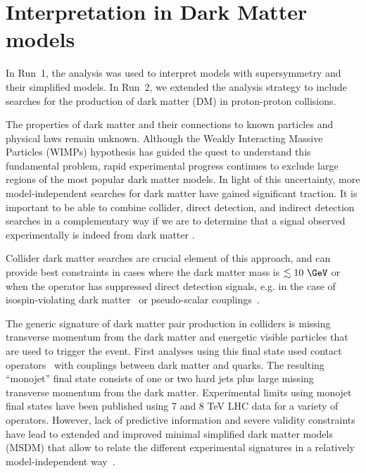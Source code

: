 \section{Interpretation in Dark Matter models}
\label{sec:darkmatter}

In Run~1, the \alphat analysis was used to interpret models with supersymmetry and their simplified models. In Run~2, we extended the analysis strategy to include searches for the production of dark matter (DM) in  proton-proton collisions.

The properties of dark matter and their connections to known particles and physical laws remain unknown. Although the Weakly Interacting Massive
Particles (WIMPs) hypothesis has guided the quest to understand this fundamental problem, rapid experimental progress continues to exclude
large regions of the most popular dark matter models. In light of this uncertainty, more model-independent searches for dark matter have gained
significant traction. It is important to be able to combine collider, direct detection, and indirect detection searches in a complementary way
if we are to determine that a signal observed experimentally is indeed from dark matter \cite{Bauer:2013ihz}.

Collider dark matter searches are crucial element of this approach, and can provide best constraints in cases where the dark matter mass is $\lesssim 10\ \GeV$ or when the operator 
has suppressed direct detection signals, e.g. in the case of isospin-violating dark matter~\cite{Feng:2011vu} or pseudo-scalar couplings~\cite{Buckley:2014fba}. 

The generic signature of dark matter pair production in colliders is missing transverse momentum from the  dark matter and energetic visible particles that are used to trigger the event. First analyses using this final state  used contact operators~\cite{Goodman:2010ku} with couplings between dark matter and quarks. The resulting ``monojet'' final state consists of one or two hard jets plus large missing transverse momentum from the dark matter. Experimental limits using monojet final states have been published using 7 and 8 TeV LHC data \cite{Chatrchyan:2012me,ATLAS:2012ky} for a variety of operators.
However, lack of predictive information and severe validity constraints have lead to extended and improved minimal simplified dark matter models (MSDM) that allow to relate the different experimental signatures in a relatively model-independent way~\cite{Buchmueller:2014yoa}. 

